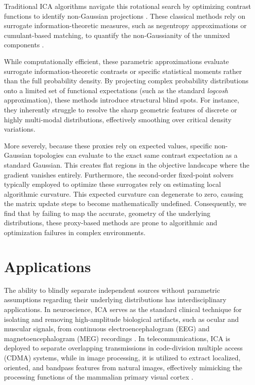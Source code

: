 \documentclass[12pt,a4paper,twoside,openany]{book}
\begin{document}
Traditional ICA algorithms navigate this rotational search by optimizing contrast functions to identify non-Gaussian projections \cite[Chapter 8]{hyvarinen2001}. 
These classical methods rely on surrogate information-theoretic measures, such as negentropy approximations or cumulant-based matching, 
to quantify the non-Gaussianity of the unmixed components \cite{amari1996new}. 

While computationally efficient, these parametric approximations evaluate surrogate information-theoretic contrasts or 
specific statistical moments rather than the full probability density. By projecting complex probability distributions 
onto a limited set of functional expectations (such as the standard \textit{logcosh} approximation), these methods introduce 
structural blind spots. For instance, they inherently struggle to resolve the sharp geometric features of discrete or highly 
multi-modal distributions, effectively smoothing over critical density variations.

More severely, because these proxies rely on expected values, specific non-Gaussian topologies can evaluate to the exact 
same contrast expectation as a standard Gaussian. This creates flat regions in the objective landscape where the gradient 
vanishes entirely. Furthermore, the second-order fixed-point solvers typically employed to optimize these surrogates rely 
on estimating local algorithmic curvature. This expected curvature can degenerate to zero, 
causing the matrix update steps to become mathematically undefined. Consequently, we find that by failing to map the accurate, 
geometry of the underlying distributions, these proxy-based methods are prone to algorithmic and  
optimization failures in complex environments.

\section{Applications}

The ability to blindly separate independent sources without parametric assumptions regarding their underlying distributions has interdisciplinary applications. 
In neuroscience, ICA serves as the standard clinical technique for isolating and removing high-amplitude biological artifacts, such as ocular and muscular signals, 
from continuous electroencephalogram (EEG) and magnetoencephalogram (MEG) recordings \cite[Chapter 21]{hyvarinen2001}. 
In telecommunications, ICA is deployed to separate overlapping transmissions in code-division multiple access (CDMA) systems, 
while in image processing, it is utilized to extract localized, oriented, and bandpass features from natural images, 
effectively mimicking the processing functions of the mammalian primary visual cortex \cite[Chapters 22-23]{hyvarinen2001}.
\end{document}
